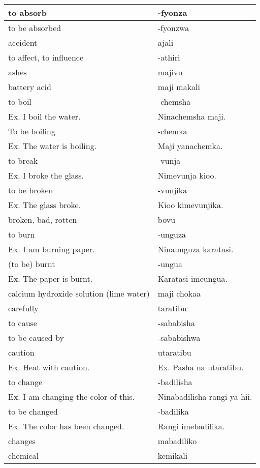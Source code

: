 \begin{center}
\begin{longtable}{|p{7cm}|p{7cm}|}
to absorb	&	-fyonza	\\	\hline
to be absorbed	&	-fyonzwa	\\	\hline
accident	&	ajali	\\	\hline
to affect, to influence	&	-athiri	\\	\hline
ashes	&	majivu	\\	\hline
battery acid	&	maji makali	\\	\hline
to boil 	&	-chemsha 	\\	
        Ex. I boil the water.	&	        Ninachemsha maji.	\\	\hline
To be boiling 	&	-chemka 	\\	
        Ex. The water is boiling.	&	        Maji yanachemka.	\\	\hline
to break 	&	-vunja 	\\	
        Ex. I broke the glass.	&	        Nimevunja kioo.	\\	\hline
to be broken 	&	-vunjika 	\\	
        Ex. The glass broke.	&	        Kioo kimevunjika.	\\	\hline
broken, bad, rotten	&	bovu	\\	\hline
to burn	&	-unguza 	\\	
        Ex. I am burning paper.  	&	        Ninaunguza karatasi.	\\	\hline
(to be) burnt	&	-ungua 	\\	
        Ex. The paper is burnt.	&	        Karatasi imeungua.	\\	\hline
calcium hydroxide solution (lime water)	&	maji chokaa	\\	\hline
carefully	&	taratibu	\\	\hline
to cause	&	-sababisha	\\	\hline
to be caused by	&	-sababishwa	\\	\hline
caution 	&	utaratibu 	\\	
        Ex. Heat with caution.	&	        Ex. Pasha na utaratibu.	\\	\hline
to change 	&	-badilisha 	\\	
        Ex. I am changing the color of this.	&	        Ninabadilisha rangi ya hii. 	\\	\hline
to be changed 	&	-badilika 	\\	
        Ex. The color has been changed. 	&	        Rangi imebadilika.	\\	\hline
changes	&	mabadiliko	\\	\hline
chemical	&	kemikali	\\	\hline

\end{longtable}
\end{center}
